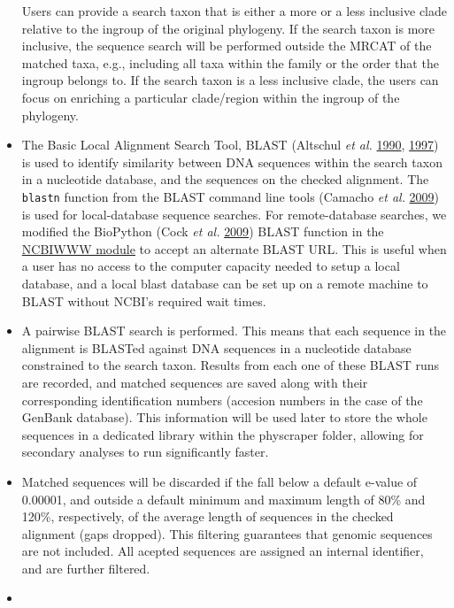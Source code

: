 \documentclass[]{article}
\begin{document}
\begin{itemize}
  Users can provide a search taxon that is either a more or a less inclusive
  clade relative to the ingroup of the original phylogeny. If the search taxon is more inclusive, the sequence search will be performed outside the MRCAT of the matched taxa, e.g., including all taxa within
  the family or the order that the ingroup belongs to. If the search taxon is a less inclusive clade, the users can focus on enriching a particular clade/region within the ingroup of the phylogeny.
\item
  The Basic Local Alignment Search Tool, BLAST (Altschul \emph{et al.} \protect\hyperlink{ref-altschul1990basic}{1990}, \protect\hyperlink{ref-altschul1997gapped}{1997}) is used to identify
  similarity between DNA sequences within the search taxon in a nucleotide
  database, and the sequences on the checked alignment.
  The \texttt{blastn} function from the BLAST command line tools (Camacho \emph{et al.} \protect\hyperlink{ref-camacho2009blast}{2009}) is used for local-database sequence searches.
  For remote-database searches, we modified the BioPython (Cock \emph{et al.} \protect\hyperlink{ref-cock2009biopython}{2009}) BLAST function in the \href{https://biopython.org/DIST/docs/api/Bio.Blast.NCBIWWW-module.html}{NCBIWWW module} to accept an alternate BLAST URL. This is useful when a user has no access to the computer capacity needed to setup a local database, and a local blast database can be set up on a remote machine to BLAST without NCBI's required wait times.
\item
  A pairwise BLAST search is performed. This means that each sequence
  in the alignment is BLASTed against DNA sequences in a nucleotide database constrained to the search
  taxon. Results from each one of these BLAST runs are recorded, and matched sequences are saved
  along with their corresponding identification numbers (accesion numbers in the case of the GenBank database). This information will be used later to store the whole sequences in a dedicated library within the physcraper folder, allowing for secondary analyses to run significantly faster.
\item
  Matched sequences will be discarded if the fall below a default e-value of 0.00001, and outside a default minimum and maximum length of 80\% and 120\%, respectively, of the average length of sequences in the checked alignment (gaps dropped).
  This filtering guarantees that genomic sequences are not included.
  All acepted sequences are assigned an internal identifier, and are further filtered.
\item

\end{itemize}
\end{document}
